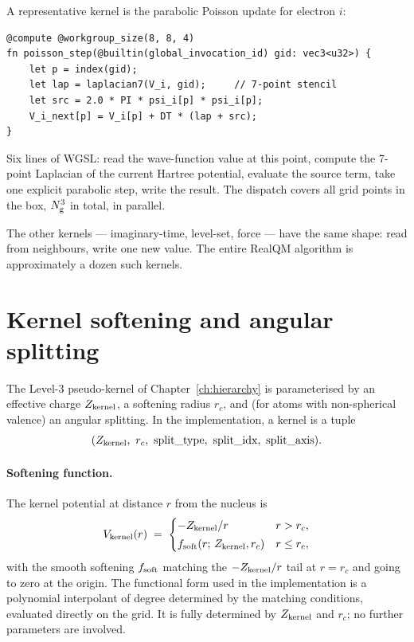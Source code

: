 A representative kernel is the parabolic Poisson update for electron $i$:
\begin{verbatim}
@compute @workgroup_size(8, 8, 4)
fn poisson_step(@builtin(global_invocation_id) gid: vec3<u32>) {
    let p = index(gid);
    let lap = laplacian7(V_i, gid);     // 7-point stencil
    let src = 2.0 * PI * psi_i[p] * psi_i[p];
    V_i_next[p] = V_i[p] + DT * (lap + src);
}
\end{verbatim}
Six lines of WGSL: read the wave-function value at this point, compute the 7-point Laplacian of the current Hartree potential, evaluate the source term, take one explicit parabolic step, write the result. The dispatch covers all grid points in the box, $N_{\rm g}^3$ in total, in parallel.

The other kernels --- imaginary-time, level-set, force --- have the same shape: read from neighbours, write one new value. The entire RealQM algorithm is approximately a dozen such kernels.

\section{Kernel softening and angular splitting}\label{sec:kernel-splitting}

The Level-3 pseudo-kernel of Chapter~\ref{ch:hierarchy} is parameterised by an effective charge $Z_{\rm kernel}$, a softening radius $r_c$, and (for atoms with non-spherical valence) an angular splitting. In the implementation, a kernel is a tuple
\[
(Z_{\rm kernel},\ r_c,\ \text{split\_type},\ \text{split\_idx},\ \text{split\_axis}).
\]

\paragraph{Softening function.} The kernel potential at distance $r$ from the nucleus is
\[
V_{\rm kernel}(r) \;=\;
\begin{cases}
-Z_{\rm kernel}/r & r > r_c, \\[2pt]
f_{\rm soft}(r;\, Z_{\rm kernel}, r_c) & r \le r_c,
\end{cases}
\]
with the smooth softening $f_{\rm soft}$ matching the $-Z_{\rm kernel}/r$ tail at $r = r_c$ and going to zero at the origin. The functional form used in the implementation is a polynomial interpolant of degree determined by the matching conditions, evaluated directly on the grid. It is fully determined by $Z_{\rm kernel}$ and $r_c$; no further parameters are involved.

